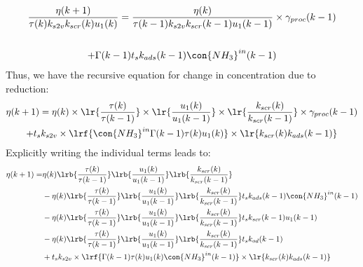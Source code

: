 \begin{multline*}
        \frac{\eta(k+1)}{\tau(k) k_{s2v} k_{scr}(k) u_1(k)}
        = \frac{\eta(k)}{\tau(k-1) k_{s2v} k_{scr}(k-1) u_1(k-1)} \times \gamma_{proc}(k-1)\\
                        \\ + \Gamma(k-1) t_s k_{ads}(k-1) \con{NH_3}^{in}(k-1)
\end{multline*}
Thus, we have the recursive equation for change in concentration due to reduction:
\begin{multline}
        \eta(k+1) = \eta(k) \times \lr{\frac{\tau(k)}{\tau(k-1)}}
                                \times \lr{\frac{u_1(k)}{u_1(k-1)}}
                                \times \lr{\frac{k_{scr}(k)}{k_{scr}(k-1)}}
                                \times \gamma_{proc}(k-1)
                                \\
                        + t_s k_{s2v} \times \lrf{\con{NH_3}^{in} \Gamma(k-1) \tau(k) u_1(k)} \times \lr{k_{scr}(k) k_{ads}(k-1)}
\end{multline}
Explicitly writing the individual terms leads to:
\begin{align*}
        \eta(k+1) =& \eta(k) \lrb{\frac{\tau(k)}{\tau(k-1)}}
                                \lrb{\frac{u_1(k)}{u_1(k-1)}}
                                \lrb{\frac{k_{scr}(k)}{k_{scr}(k-1)}} \\
                &-\eta(k) \lrb{\frac{\tau(k)}{\tau(k-1)}}
                                \lrb{\frac{u_1(k)}{u_1(k-1)}}
                                \lrb{\frac{k_{scr}(k)}{k_{scr}(k-1)}}
                t_s k_{ads}(k-1) \con{NH_3}^{in}(k-1)
                \\
                &-\eta(k) \lrb{\frac{\tau(k)}{\tau(k-1)}}
                                \lrb{\frac{u_1(k)}{u_1(k-1)}}
                                \lrb{\frac{k_{scr}(k)}{k_{scr}(k-1)}}
                t_s k_{scr}(k-1) u_1(k-1)
                \\
                &-\eta(k) \lrb{\frac{\tau(k)}{\tau(k-1)}}
                                \lrb{\frac{u_1(k)}{u_1(k-1)}}
                                \lrb{\frac{k_{scr}(k)}{k_{scr}(k-1)}}
                t_s k_{od}(k-1)
                \\
                &+ t_s k_{s2v} \times \lrf{\Gamma(k-1) \tau(k) u_1(k) \con{NH_3}^{in}(k-1)} \times \lr{k_{scr}(k) k_{ads}(k-1)}
\end{align*}
\begin{equation}
       \label{eqn::nox_reduction_govern}
\end{equation}
